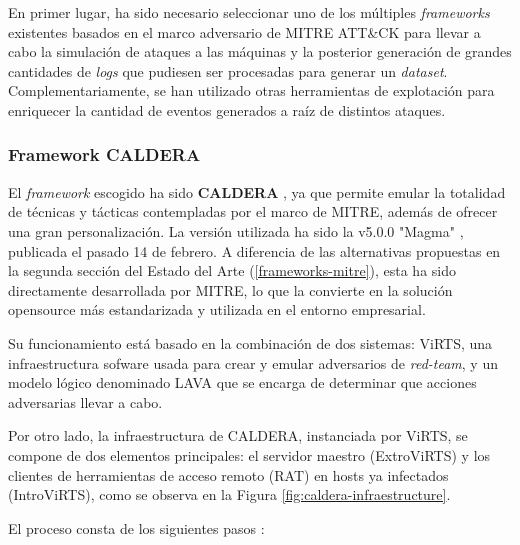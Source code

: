 En primer lugar, ha sido necesario seleccionar uno de los múltiples \textit{frameworks} existentes basados en el marco adversario de  MITRE \gls{ATT&CK} para llevar a cabo la simulación de ataques a las máquinas y la posterior generación de grandes cantidades de \textit{logs} que pudiesen ser procesadas para generar un \textit{dataset}. Complementariamente, se han utilizado otras herramientas de explotación para enriquecer la cantidad de eventos generados a raíz de distintos ataques.

\vspace{-1mm}

\subsubsection*{Framework \gls{CALDERA}}

El \textit{framework} escogido ha sido \textbf{\gls{CALDERA}} \cite{caldera}, ya que permite emular la totalidad de técnicas y tácticas contempladas por el marco de MITRE, además de ofrecer una gran personalización. La versión utilizada ha sido la v5.0.0 "Magma" \cite{caldera_v500}, publicada el pasado 14 de febrero. A diferencia de las alternativas propuestas en la segunda sección del Estado del Arte (\ref{frameworks-mitre}), esta ha sido directamente desarrollada por MITRE, lo que la convierte en la solución opensource más estandarizada y utilizada en el entorno empresarial. 

Su funcionamiento está basado en la combinación de dos sistemas: \gls{ViRTS}, una infraestructura sofware usada para crear y emular adversarios de \textit{red-team}, y un modelo lógico denominado \gls{LAVA} que se encarga de determinar que acciones adversarias llevar a cabo. 

Por otro lado, la infraestructura de \gls{CALDERA}, instanciada por \gls{ViRTS}, se compone de dos elementos principales: el servidor maestro (ExtroViRTS) y los clientes de herramientas de acceso remoto (\gls{RAT}) en hosts ya infectados (IntroViRTS), como se observa en la Figura \ref{fig:caldera-infraestructure}. 

El proceso consta de los siguientes pasos \cite{gjerstad2022generating}:

